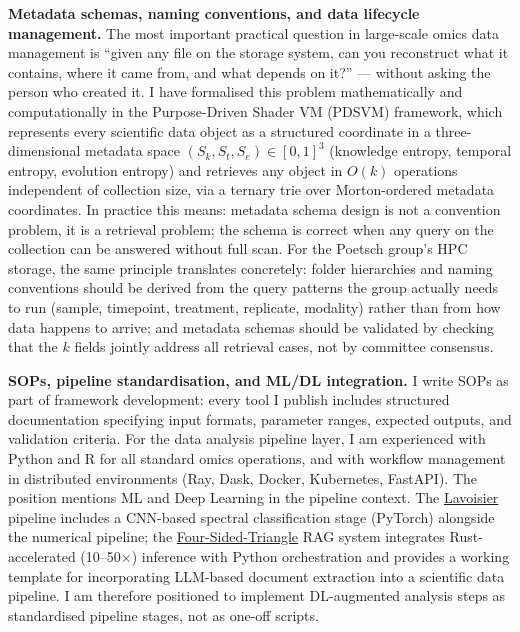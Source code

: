 \documentclass[12pt,a4paper]{article}
\begin{document}
\textbf{Metadata schemas, naming conventions, and data lifecycle management.}
The most important practical question in large-scale omics data management is
``given any file on the storage system, can you reconstruct what it contains,
where it came from, and what depends on it?'' --- without asking the person who
created it.
I have formalised this problem mathematically and computationally in the
Purpose-Driven Shader VM (PDSVM) framework, which represents every scientific
data object as a structured coordinate in a three-dimensional metadata space
$(S_k, S_t, S_e) \in [0,1]^3$ (knowledge entropy, temporal entropy, evolution
entropy) and retrieves any object in $O(k)$ operations independent of
collection size, via a ternary trie over Morton-ordered metadata coordinates.
In practice this means: metadata schema design is not a convention problem,
it is a retrieval problem; the schema is correct when any query on the collection
can be answered without full scan.
For the Poetsch group's HPC storage, the same principle translates concretely:
folder hierarchies and naming conventions should be derived from the query patterns
the group actually needs to run (sample, timepoint, treatment, replicate, modality)
rather than from how data happens to arrive; and metadata schemas should be
validated by checking that the $k$ fields jointly address all retrieval cases,
not by committee consensus.

\textbf{SOPs, pipeline standardisation, and ML/DL integration.}
I write SOPs as part of framework development: every tool I publish includes
structured documentation specifying input formats, parameter ranges, expected
outputs, and validation criteria.
For the data analysis pipeline layer, I am experienced with Python and R for
all standard omics operations, and with workflow management in distributed
environments (Ray, Dask, Docker, Kubernetes, FastAPI).
The position mentions ML and Deep Learning in the pipeline context.
The \href{https://github.com/fullscreen-triangle/lavoisier}{Lavoisier} pipeline
includes a CNN-based spectral classification stage (PyTorch) alongside the
numerical pipeline; the \href{https://github.com/fullscreen-triangle/four-sided-triangle}{Four-Sided-Triangle}
RAG system integrates Rust-accelerated (10--50$\times$) inference with
Python orchestration and provides a working template for incorporating
LLM-based document extraction into a scientific data pipeline.
I am therefore positioned to implement DL-augmented analysis steps as
standardised pipeline stages, not as one-off scripts.
\end{document}
